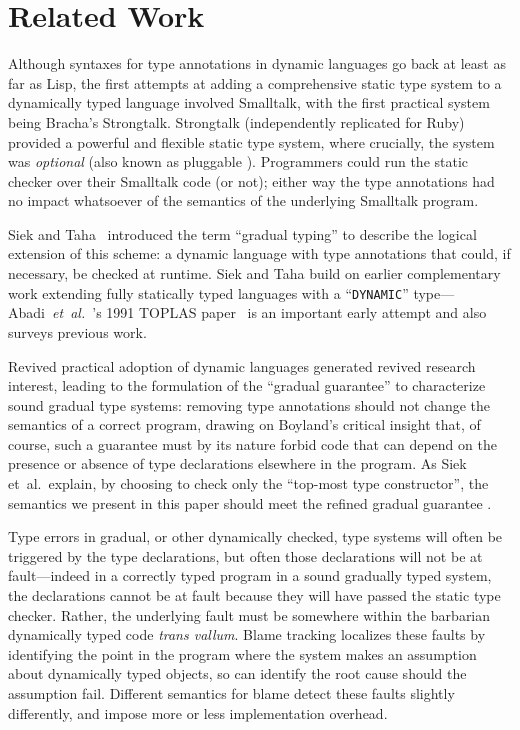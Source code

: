
\section{Related Work}
\label{sec:related-work}

Although syntaxes for type annotations in dynamic languages go back at
least as far as Lisp\citep{cltl2}, the first attempts at adding a
comprehensive static type system to a dynamically typed
language involved 
Smalltalk\citep{RalphJohnson1986}, with the first practical system
being Bracha's Strongtalk\citep{strongtalk}. Strongtalk
(independently replicated for Ruby\citep{DBRuby09}) provided a
powerful and flexible static type system, where crucially, the system
was \emph{optional} (also known as pluggable
\cite{GiladPluggable2004}). Programmers could run the static checker
over their Smalltalk code (or not); either way the type annotations
had no impact whatsoever of the semantics of the underlying Smalltalk
program.

Siek and Taha~\cite{Siek2006} introduced the term ``gradual typing''
 to describe the logical extension of this scheme: a
dynamic language with type annotations that could, if necessary, be
checked at runtime. Siek and Taha build on earlier complementary work extending fully statically typed languages with a ``\texttt{DYNAMIC}''
type---Abadi~\textit{et~al.}~'s 1991 TOPLAS paper~\cite{AbadiTOPLAS1991} is an
important early attempt
and also surveys previous work.

Revived practical adoption of dynamic languages generated revived
research interest, leading to the formulation of the ``gradual
guarantee''\citep{Siek2006,XXXSiek2015} to characterize sound gradual
type systems: removing type annotations should not change the
semantics of a correct program, drawing on Boyland's critical insight
that, of course, such a guarantee must by its nature forbid code that
can depend on the presence or absence of type declarations elsewhere
in the program\citep{Boyland2014}.  As Siek et~al.\ explain, by
choosing to check only the ``top-most type constructor'', the
semantics we present in this paper should meet the refined gradual
guarantee \cite{XXXSiek2015}.


Type errors in gradual, or other dynamically checked, type systems will
often be triggered by the type declarations, but often those
declarations will not be at fault---indeed in a correctly typed
program in a sound gradually typed system,  the declarations cannot be
at fault because they will have passed the static type
checker. Rather, the underlying fault must be somewhere within the
barbarian dynamically typed code \emph{trans vallum}.
Blame tracking\citep{blame2009,blameThreesomes2010,blameForAll2011} localizes these
faults by identifying 
the point in the program where the system makes an 
assumption about dynamically typed objects, so can identify the root
cause should the assumption fail.  Different semantics for blame
detect these faults slightly differently, and impose more or less
implementation
overhead\citep{reticPython2014,monotonic2015,Vitousek2017}.


